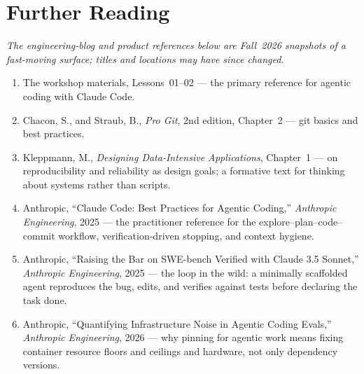 \section*{Further Reading}

\emph{The engineering-blog and product references below are Fall~2026 snapshots of a fast-moving surface; titles and locations may have since changed.}

\begin{small}
\begin{enumerate}
\item The workshop materials,  Lessons~01--02 — the primary reference for agentic coding with Claude Code.
\item Chacon, S., and Straub, B., \emph{Pro Git}, 2nd edition, Chapter~2 — git basics and best practices.
\item Kleppmann, M., \emph{Designing Data-Intensive Applications}, Chapter~1 — on reproducibility and reliability as design goals; a formative text for thinking about systems rather than scripts.
\item Anthropic, ``Claude Code: Best Practices for Agentic Coding,'' \emph{Anthropic Engineering}, 2025 — the practitioner reference for the explore--plan--code--commit workflow, verification-driven stopping, and context hygiene.
\item Anthropic, ``Raising the Bar on SWE-bench Verified with Claude 3.5 Sonnet,'' \emph{Anthropic Engineering}, 2025 — the loop in the wild: a minimally scaffolded agent reproduces the bug, edits, and verifies against tests before declaring the task done.
\item Anthropic, ``Quantifying Infrastructure Noise in Agentic Coding Evals,'' \emph{Anthropic Engineering}, 2026 — why pinning for agentic work means fixing container resource floors and ceilings and hardware, not only dependency versions.
\end{enumerate}
\end{small}

